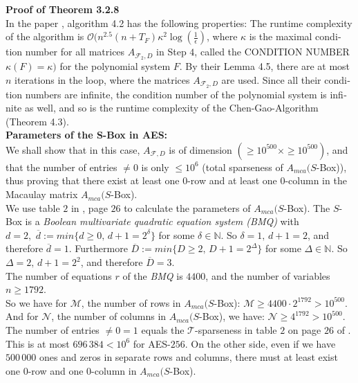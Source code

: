 \documentclass[a4paper,11pt]{article}
\begin{document}
\begin{otherlanguage}{english}
\noindent
\textbf{Proof of Theorem 3.2.8} \\
In the paper \cite{QAA}, algorithm 4.2 has the following properties: The runtime complexity of the algorithm is  $\mathcal{O}(n^{2.5}(n + T_F)\kappa^2 \log(\frac{1}{\epsilon})$, where $\kappa$ is the maximal condition number for all matrices $A_{\mathcal{F}_2,D}$ in Step $4$, called the CONDITION NUMBER $\kappa(F) = \kappa)$ for the polynomial system $F$. By their Lemma 4.5, there are at most $n$ iterations in the loop, where the matrices $A_{\mathcal{F}_2,D}$ are used. Since all their condition numbers are infinite, the condition number of the polynomial system is infinite as well, and so is the runtime complexity of the Chen-Gao-Algorithm (Theorem 4.3). \\

\noindent
\textbf{Parameters of the S-Box in \textsc{AES}:} \\
We shall show that in this case, $A_{\mathcal{F},D}$ is of dimension $( \geq 10^{500} \times \geq 10^{500})$, and that the number of entries $\neq 0$ is only $\leq 10^6$ (total sparseness of $A_{mca}(S$-Box)), thus proving that there exist at least one $0$-row and at least one $0$-column in the Macaulay matrix $A_{mca}(S$-Box).\\

\noindent
We use table $2$ in \cite{QAA}, page $26$ to calculate the parameters of $A_{mca}(S$-Box). The $S$-Box is a \textit{Boolean multivariate quadratic equation system (BMQ)} with $d = 2,\,\, \overline{d} := min \{d \geq 0,\, d + 1 = 2^\delta\}$ for some  $\delta \in \mathbb{N}$. So $\delta = 1, \, d + 1 = 2$, and therefore $\overline{d} = 1$. Furthermore $\overline{D}:= min \{D \geq 2, \, D + 1 = 2^\Delta\}$ for some $\Delta \in \mathbb{N}$. So $\Delta = 2, \, d + 1 = 2^2$, and therefore $\overline{D} = 3$. \\

\noindent
The number of equations $r$ of the \textit{BMQ} is $4400$, and the number of variables $n \geq 1792$. \\
So we have for $\mathcal{M}$, the number of rows in $A_{mca}(S$-Box): $\mathcal{M} \geq 4400 \cdot 2^{1792} > 10^{500}$.\\
And for $\mathcal{N}$, the number of columns in $A_{mca}(S$-Box), we have: $\mathcal{N} \geq 4^{1792} > 10^{500}$. \\

\noindent
The number of entries $\neq 0 = 1$ equals the $\mathcal{T}$-sparseness in table $2$ on page $26$ of \cite{QAA}. This is at most $696\,384 < 10^6$ for \textsc{AES}-$256$. On the other side, even if we have $500\,000$ ones and zeros in separate rows and columns, there must at least exist one $0$-row and one $0$-column in $A_{mca}(S$-Box).\\ 



\end{otherlanguage}
\end{document}
